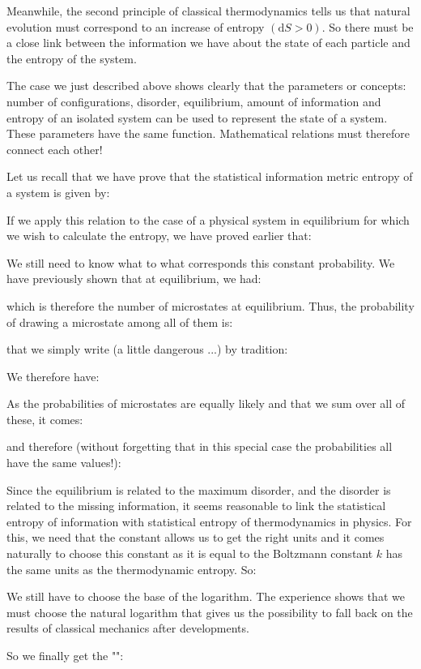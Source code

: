 	Meanwhile, the second principle of classical thermodynamics tells us that natural evolution must correspond to an increase of entropy $(\mathrm{d}S>0)$. So there must be a close link between the information we have about the state of each particle and the entropy of the system.
	
	The case we just described above shows clearly  that the parameters or concepts: number of configurations, disorder, equilibrium, amount of information and entropy of an isolated system can be used to represent the state of a system. These parameters have the same function. Mathematical relations must therefore connect each other!
	
	Let us recall that we have prove that the statistical information metric entropy of a system is given by:
	
	If we apply this relation to the case of a physical system in equilibrium for which we wish to calculate the entropy, we have proved earlier that:
	
	We still need to know what to what corresponds this constant probability. We have previously shown that at equilibrium, we had:
	
	which is therefore the number of microstates at equilibrium. Thus, the probability of drawing a microstate among all of them is:
	
	that we simply write (a little dangerous ...) by tradition:
	
	We therefore have:
	
	As the probabilities of microstates are equally likely and that we sum over all of these, it comes:
	
	and therefore (without forgetting that in this special case the probabilities all have the same values!):
	
	Since the equilibrium is related to the maximum disorder, and the disorder is related to the missing information, it seems reasonable to link the statistical entropy of information with statistical entropy  of thermodynamics in physics. For this, we need that the constant allows us to get the right units and it comes naturally to choose this constant as it is equal to the Boltzmann constant $k$ has the same units as the thermodynamic entropy. So:
	
	We still have to choose the base of the logarithm. The experience shows that we must choose the natural logarithm that gives us the possibility to fall back on the results of classical mechanics after developments.

	So we finally get the "":
	
